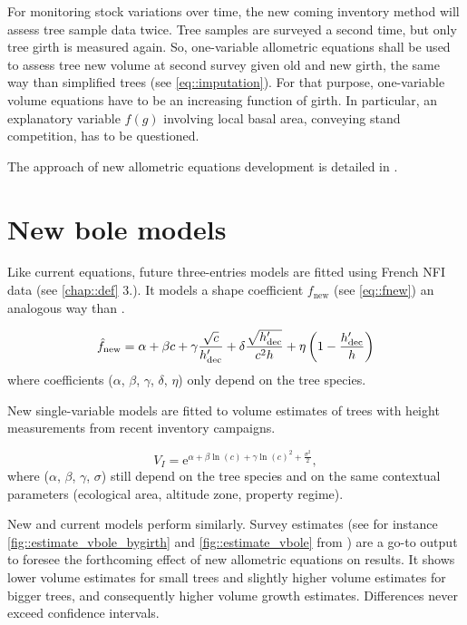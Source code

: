 For monitoring stock variations over time, the new coming inventory method will assess tree sample data twice. Tree samples are surveyed a second time, but only tree girth is measured again. So, one-variable allometric equations shall be used to assess tree new volume at second survey given old and new girth, the same way than simplified trees (see \ref{eq::imputation}). For that purpose, one-variable volume equations have to be an increasing function of girth. In particular, an explanatory variable \( f(g) \) involving local basal area, conveying stand competition, has to be questioned.  

The approach of new allometric equations development is detailed in \cite{Gohon2024}.  

\section{New bole models\label{sec::new_allom}}

Like current equations, future three-entries models are fitted using French NFI data (see \ref{chap::def} 3.). It models a shape coefficient \( f_{\text{new}} \) (see \ref{eq::fnew}) an analogous way than \cite{Morneau2016}.  

\[
	\hat f_{\text{new}} = \alpha + \beta c + \gamma \frac{\sqrt{c}}{h_{\text{dec}}'} + \delta \frac{\sqrt{h_{\text{dec}}'}}{c^2 h} + \eta \left( 1 - \frac{h_{\text{dec}}'}{h} \right)
\]
where coefficients (\( \alpha \), \( \beta \), \( \gamma \), \( \delta \), \( \eta \)) only depend on the tree species.  

New single-variable models are fitted to volume estimates of trees with height measurements from recent inventory campaigns.

\[
	V_{I} = \mathrm{e}^{\alpha + \beta \ln(c) + \gamma \ln(c)^2 + \frac{\sigma^2}{2}},
\]
where (\( \alpha \), \( \beta \), \( \gamma \), \( \sigma \)) still depend on the tree species and on the same contextual parameters (ecological area, altitude zone, property regime).

New and current models perform similarly.
Survey estimates (see for instance \ref{fig::estimate_vbole_bygirth} and \ref{fig::estimate_vbole} from \cite{Gohon2024}) are a go-to output to foresee the forthcoming effect of new allometric equations on \NFI{} results. It shows lower volume estimates for small trees and slightly higher volume estimates for bigger trees, and consequently higher volume growth estimates. Differences never exceed confidence intervals.

